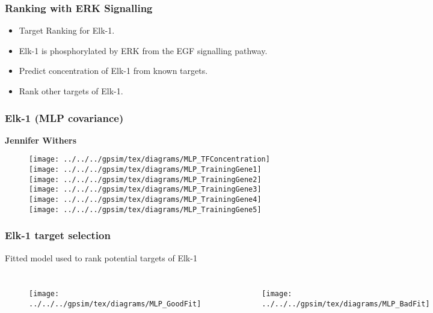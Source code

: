 

\begin{frame}
  \frametitle{Ranking with ERK Signalling}
  \begin{itemize}
  \item Target Ranking for Elk-1.
  \item Elk-1 is phosphorylated by ERK from the EGF signalling pathway.
  \item Predict concentration of Elk-1 from known targets.
  \item Rank other targets of Elk-1.
  \end{itemize}

\end{frame}


\begin{frame}
  \frametitle{Elk-1 (MLP covariance)}

  \begin{flushright}
    \textbf{Jennifer Withers}
    \par\end{flushright}

  \begin{figure}
    \centering{}\texttt{[image: ../../../gpsim/tex/diagrams/MLP\_TFConcentration]}\hfill{}\texttt{[image: ../../../gpsim/tex/diagrams/MLP\_TrainingGene1]}\hfill{}\texttt{[image: ../../../gpsim/tex/diagrams/MLP\_TrainingGene2]}\\
    \texttt{[image: ../../../gpsim/tex/diagrams/MLP\_TrainingGene3]}\hfill{}\texttt{[image: ../../../gpsim/tex/diagrams/MLP\_TrainingGene4]}\hfill{}\texttt{[image: ../../../gpsim/tex/diagrams/MLP\_TrainingGene5]}
  \end{figure}

\end{frame}

\begin{frame}
  \frametitle{Elk-1 target selection}

  Fitted model used to rank potential targets of Elk-1
  \begin{columns}[c]%


    \column{2.5 in}

    \begin{figure}
      \centering{} \texttt{[image: ../../../gpsim/tex/diagrams/MLP\_GoodFit]} 
    \end{figure}


    \centering


    \column{2.5 in}

    \begin{figure}
      \centering{} \texttt{[image: ../../../gpsim/tex/diagrams/MLP\_BadFit]} 
    \end{figure}


  \end{columns}%

\end{frame}


